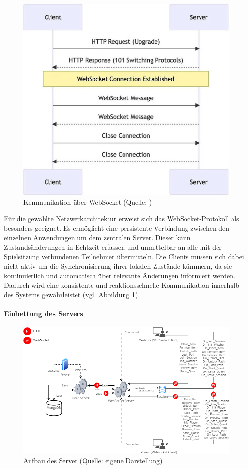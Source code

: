 \begin{figure}[ht]
\centering
\includegraphics[width=0.5\linewidth]{content/pictures/WebSocket-Network.png}
\caption{Kommunikation über WebSocket (Quelle: \citealp{mygames_unity_2024})}
\label{fig:ws}
\end{figure}

Für die gewählte Netzwerkarchitektur erweist sich das WebSocket-Protokoll als besonders geeignet. Es ermöglicht eine persistente Verbindung zwischen den einzelnen Anwendungen um dem zentralen Server. Dieser kann Zustandsänderungen in Echtzeit erfassen und unmittelbar an alle mit der Spielsitzung verbundenen Teilnehmer übermitteln. Die Clients müssen sich dabei nicht aktiv um die Synchronisierung ihrer lokalen Zustände kümmern, da sie kontinuierlich und automatisch über relevante Änderungen informiert werden. Dadurch wird eine konsistente und reaktionsschnelle Kommunikation innerhalb des Systems gewährleistet (vgl. Abbildung \ref{fig:ws}).

\paragraph{Einbettung des Servers}

\begin{figure}[ht]
\centering
\includegraphics[width=1\linewidth]{content/pictures/Server-System.png}
\caption{Aufbau des Server (Quelle: eigene Darstellung)}
\label{fig:cm-server}
\end{figure}

